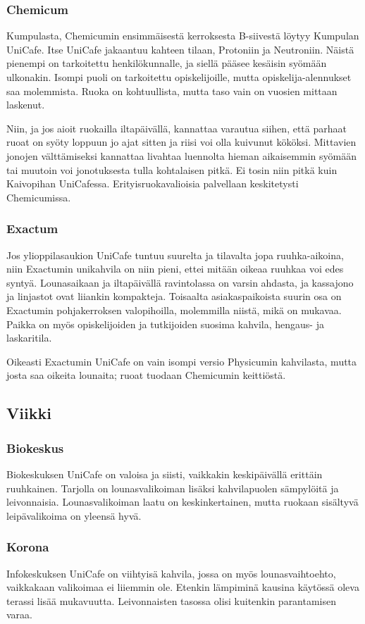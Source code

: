 \documentclass[../ala_hataile.tex]{subfiles}
\begin{document}
\subsubsection*{Chemicum}
Kumpulasta, Chemicumin ensimmäisestä
kerroksesta B-siivestä löytyy
Kumpulan UniCafe. Itse UniCafe jakaantuu
kahteen tilaan, Protoniin ja Neutroniin. Näistä pienempi on tarkoitettu henkilökunnalle, ja siellä pääsee kesäisin syömään ulkonakin. Isompi puoli on tarkoitettu
opiskelijoille, mutta opiskelija-alennukset saa molemmista. Ruoka on kohtuullista,
mutta taso vain on vuosien mittaan laskenut.

Niin, ja jos aioit ruokailla iltapäivällä,
kannattaa varautua siihen, että parhaat ruoat
on syöty loppuun jo ajat sitten ja riisi voi
olla kuivunut kököksi. Mittavien jonojen
välttämiseksi kannattaa livahtaa luennolta
hieman aikaisemmin syömään tai muutoin
voi jonotuksesta tulla kohtalaisen pitkä. Ei
tosin niin pitkä kuin Kaivopihan UniCafessa. Erityisruokavalioisia palvellaan keskitetysti
Chemicumissa.
\subsubsection*{Exactum}
Jos ylioppilasaukion UniCafe tuntuu
suurelta ja tilavalta jopa ruuhka-aikoina,
niin Exactumin unikahvila on niin pieni, ettei
mitään oikeaa ruuhkaa voi edes syntyä.
Lounasaikaan ja iltapäivällä ravintolassa
on varsin ahdasta, ja kassajono ja linjastot
ovat liiankin kompakteja. Toisaalta asiakaspaikoista
suurin osa on Exactumin pohjakerroksen
valopihoilla, molemmilla niistä,
mikä on mukavaa. Paikka on myös opiskelijoiden
ja tutkijoiden suosima kahvila,
hengaus- ja laskaritila. 

Oikeasti Exactumin
UniCafe on vain isompi versio Physicumin
kahvilasta, mutta josta saa oikeita lounaita;
ruoat tuodaan Chemicumin keittiöstä.

\subsection*{Viikki}
\subsubsection*{Biokeskus}
Biokeskuksen UniCafe on valoisa ja
siisti, vaikkakin keskipäivällä erittäin
ruuhkainen. Tarjolla on lounasvalikoiman
lisäksi kahvilapuolen sämpylöitä ja leivonnaisia.
Lounasvalikoiman laatu on keskinkertainen,
mutta ruokaan sisältyvä leipävalikoima
on yleensä hyvä.
\subsubsection*{Korona}
Infokeskuksen UniCafe on viihtyisä
kahvila, jossa on myös lounasvaihtoehto,
vaikkakaan valikoimaa ei liiemmin ole.
Etenkin lämpiminä kausina käytössä oleva
terassi lisää mukavuutta. Leivonnaisten
tasossa olisi kuitenkin parantamisen varaa.
\end{document}
